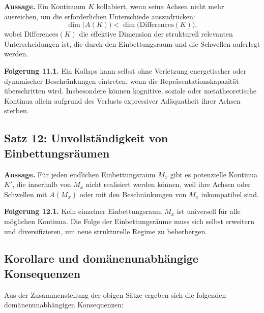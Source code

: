 \textbf{Aussage.}
Ein Kontinuum \(K\) kollabiert, wenn seine Achsen nicht mehr ausreichen, um die erforderlichen Unterschiede auszudrücken:
\[
    \dim\big(A(K)\big) < \dim\big(\mathrm{Differences}(K)\big),
\]
wobei \(\mathrm{Differences}(K)\) die effektive Dimension der strukturell relevanten Unterscheidungen ist, die durch den Einbettungsraum und die Schwellen auferlegt werden.

\textbf{Folgerung 11.1.}
Ein Kollaps kann selbst ohne Verletzung energetischer oder dynamischer Beschränkungen eintreten, wenn die Repräsentationskapazität überschritten wird.
Insbesondere können kognitive, soziale oder metatheoretische Kontinua allein aufgrund des Verlusts expressiver Adäquatheit ihrer Achsen sterben.

\subsection{Satz 12: Unvollständigkeit von Einbettungsräumen}

\textbf{Aussage.}
Für jeden endlichen Einbettungsraum \(M_x\) gibt es potenzielle Kontinua \(K'\), die innerhalb von \(M_x\) nicht realisiert werden können, weil ihre Achsen oder Schwellen mit \(A(M_x)\) oder mit den Beschränkungen von \(M_x\) inkompatibel sind.

\textbf{Folgerung 12.1.}
Kein einzelner Einbettungsraum \(M_x\) ist universell für alle möglichen Kontinua.
Die Folge der Einbettungsräume muss sich selbst erweitern und diversifizieren, um neue strukturelle Regime zu beherbergen.

\subsection{Korollare und domänenunabhängige Konsequenzen}

Aus der Zusammenstellung der obigen Sätze ergeben sich die folgenden domänenunabhängigen Konsequenzen:

